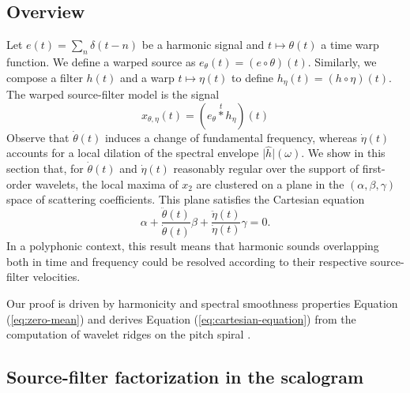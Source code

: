 \documentclass[twoside,a4paper]{article}
\begin{document}
\subsection{Overview}

Let $e(t)=\sum_{n}\delta(t - n)$ be a harmonic signal and
$t\mapsto\theta(t)$ a time warp function. We define a warped source
as $e_{\theta}(t)=(e\circ\theta)(t)$. Similarly, we compose a
filter $h(t)$ and a warp $t\mapsto\eta(t)$ to define $h_{\eta}(t)=(h\circ\eta)(t)$.
The warped source-filter model is the signal
\begin{equation}
x_{\theta, \eta}(t) =
(e_{\theta} \overset{t}{\ast} h_{\eta})(t)
\label{eq:source-filter}
\end{equation}
Observe that $\dot{\theta}(t)$ induces a change of fundamental frequency, where\-as
$\dot{\eta}(t)$ accounts for a local dilation of the spectral
envelope $\vert\widehat{h}\vert(\omega)$.
We show in this section that, for $\dot{\theta}(t)$ and $\dot{\eta}(t)$ reasonably regular over the support of first-order wavelets,
the local maxima of $x_{2}$ are clustered on a plane in the $(\alpha,\beta,\gamma)$ space of scattering coefficients.
This plane satisfies the Cartesian equation
\begin{equation}
\alpha +
\dfrac{\ddot{\theta}(t)}{\dot{\theta}(t)}\beta +
\dfrac{\ddot{\eta}(t)}{\dot{\eta}(t)}\gamma = 0.
\label{eq:cartesian-equation}
\end{equation}
In a polyphonic context, this result means that harmonic sounds overlapping both in time and frequency could be resolved according to their respective source-filter velocities.

Our proof is driven by harmonicity and spectral smoothness properties \textemdash{} Equation (\ref{eq:zero-mean}) \textemdash{} and derives Equation (\ref{eq:cartesian-equation}) from the computation of wavelet ridges on the pitch spiral \cite{Delprat1992}.



\subsection{Source-filter factorization in the scalogram}
\end{document}
